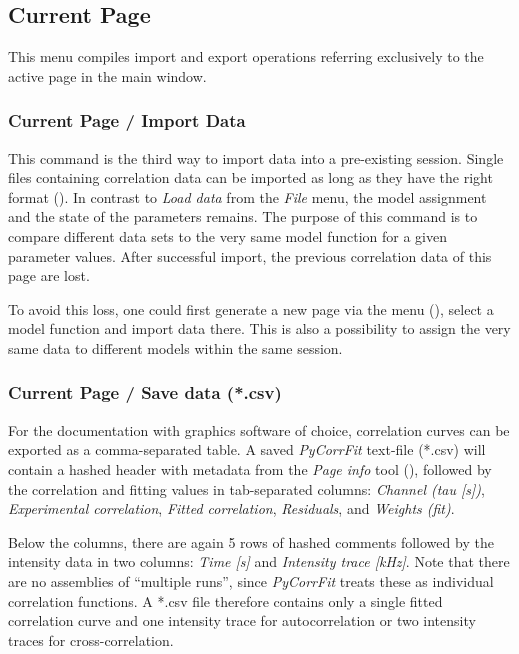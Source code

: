 \subsection{Current Page}
\label{sec:cp}
This menu compiles import and export operations referring exclusively to the active page in the main window. 

\subsubsection{Current Page / Import Data}
\label{sec:cp.id}
This command is the third way to import data into a pre-existing session. Single files containing correlation data can be imported as long as they have the right format (). In contrast to \textit{Load data} from the \textit{File} menu, the model assignment and the state of the parameters remains. The purpose of this command is to compare different data sets to the very same model function for a given parameter values. After successful import, the previous correlation data of this page are lost.

To avoid this loss, one could first generate a new page via the menu (), select a model function and import data there. This is also a possibility to assign the very same data to different models within the same session.

\subsubsection{Current Page / Save data (*.csv)}
\label{sec:cp.sd}
For the documentation with graphics software of choice, correlation curves can be exported as a comma-separated table. A saved \textit{PyCorrFit} text-file (*.csv) will contain a hashed header with metadata from the \textit{Page info} tool (), followed by the correlation and fitting values in tab-separated columns: \textit{Channel (tau [s])}, \textit{Experimental correlation}, \textit{Fitted correlation}, \textit{Residuals}, and \textit{Weights (fit)}. 

Below the columns, there are again 5 rows of hashed comments followed by the intensity data in two columns: \textit{Time [s]} and \textit{Intensity trace [kHz]}. Note that there are no assemblies of ``multiple runs'', since \textit{PyCorrFit} treats these as individual correlation functions. A *.csv file therefore contains only a single fitted correlation curve and one intensity trace for autocorrelation or two intensity traces for cross-correlation.

